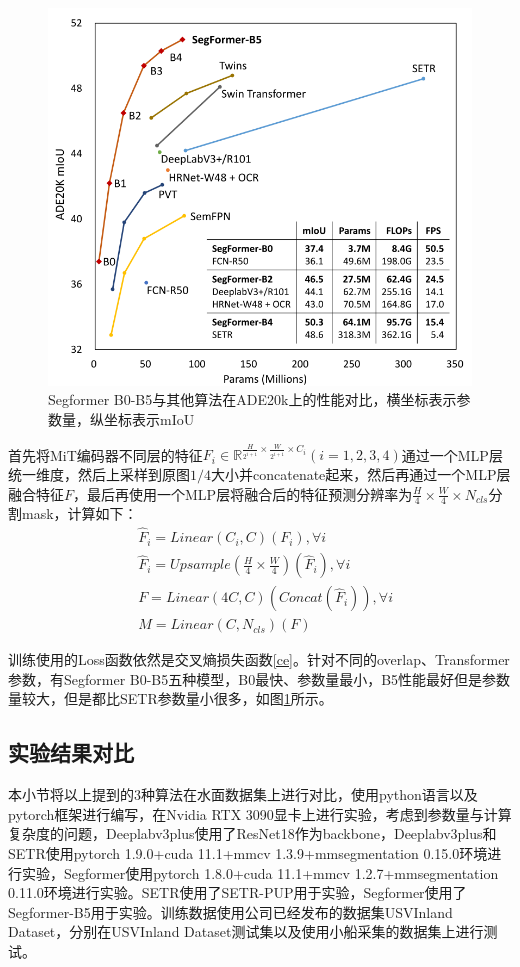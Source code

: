 \documentclass[cn,12pt,color=mine,scheme=chinese,bibstyle=gb7714-2015]{elegantbook}
\begin{document}
\begin{figure}[t]
	\centering
	\includegraphics[width=.7\linewidth]{images/segformer2}
	\caption{Segformer B0-B5与其他算法在ADE20k\cite{zhou2017scene}上的性能对比，横坐标表示参数量，纵坐标表示mIoU}
	\label{segformer2}
\end{figure}

\begin{note}
	首先将MiT编码器不同层的特征$F_i\in\mathbb{R}^{\frac{H}{2^{i+1}}\times\frac{W}{2^{i+1}}\times C_i}(i=1,2,3,4)$通过一个MLP层统一维度，然后上采样到原图$1/4$大小并concatenate起来，然后再通过一个MLP层融合特征$F$，最后再使用一个MLP层将融合后的特征预测分辨率为$\frac{H}{4}\times\frac{W}{4}\times N_{cls}$分割mask，计算如下：
	\begin{equation}
		\begin{aligned}
			&\hat{F}_i=Linear(C_i,C)(F_i),\forall i \\
			&\hat{F}_i=Upsample(\frac{H}{4}\times\frac{W}{4})(\hat{F}_i),\forall i \\
			&F=Linear(4C,C)(Concat(\hat{F}_i)),\forall i \\
			&M=Linear(C,N_{cls})(F)
		\end{aligned}
	\end{equation}
\end{note}

训练使用的Loss函数依然是交叉熵损失函数\eqref{ce}。针对不同的overlap、Transformer参数，有Segformer B0-B5五种模型，B0最快、参数量最小，B5性能最好但是参数量较大，但是都比SETR参数量小很多，如图\ref{segformer2}所示。

\subsection{实验结果对比}
本小节将以上提到的3种算法在水面数据集上进行对比，使用python语言以及pytorch框架进行编写，在Nvidia RTX 3090显卡上进行实验，考虑到参数量与计算复杂度的问题，Deeplabv3plus使用了ResNet18\cite{he2016deep}作为backbone，Deeplabv3plus和SETR使用pytorch 1.9.0+cuda 11.1+mmcv\cite{mmcv} 1.3.9+mmsegmentation\cite{mmseg2020} 0.15.0环境进行实验，Segformer使用pytorch 1.8.0+cuda 11.1+mmcv\cite{mmcv} 1.2.7+mmsegmentation\cite{mmseg2020} 0.11.0环境进行实验。SETR使用了SETR-PUP用于实验，Segformer使用了Segformer-B5用于实验。训练数据使用公司已经发布的数据集USVInland Dataset\cite{9381638}，分别在USVInland Dataset测试集以及使用小船采集的数据集上进行测试。
\end{document}
